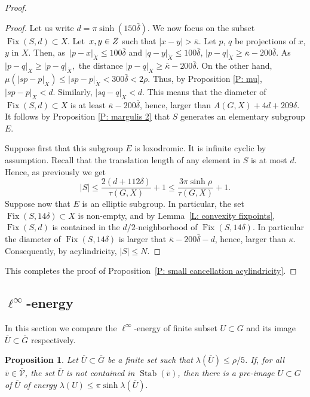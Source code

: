 \documentclass[JEP,XML,SOM,Unicode, NoEqCountersInSection,published]{cedram}
\let\mathcal\mathscr
\theoremstyle{plain}
\newtheorem{prop}[thm]{Proposition}
\theoremstyle{definition}
\newcommand{\cX}{\dot{X}}
\newcommand{\qG}{\overline{G}}
\DeclareMathOperator{\Fix}{Fix}
\newcommand{\q}[1]{\overline{#1}}
\newcommand{\stab}[1]{\operatorname{Stab}(#1)}
\begin{document}
\begin{proof}
\begin{proof}
Let us write $d=\pi \sinh (150\bar \delta)$.
We now focus on the subset $\Fix(S,d) \subset X$.
Let~$x,y \in\nobreak Z$ such that $|x-y|>\q \kappa$.
Let $p$, $q$ be projections of $x$, $y$ in $X$. Then, as~$|p-x|_{\cX}\leqslant 100 \bar \delta$ and $ |q-y|_{\cX} \leqslant 100 \bar \delta$, $|p-q|_{\cX}\geqslant \q \kappa - 200 \bar \delta$. As $|p-q|_X\geqslant |p-q|_{\cX},$
the distance $ |p-q|_X \geqslant\q \kappa - 200 \bar \delta.$
On the other hand, $\mu (|sp-p|_X)\leqslant |sp-p|_{\cX} < 300 \bar \delta <2\rho$. Thus, by Proposition \ref{P: mu}, $ |sp-p|_X< d.$ Similarly, $|sq-q|_X < d$.
This means that the diameter of $\Fix(S,d) \subset X$ is at least $\q\kappa -200 \bar \delta$, hence, larger than $A(G,X) +4d+209\delta$.
It follows by Proposition \ref{P: margulis 2} that $S$ generates an elementary subgroup $E$.

Suppose first that this subgroup $E$ is loxodromic.
It is infinite cyclic by assumption.
Recall that the translation length of any element in $S$ is at most $d$.
Hence, as previously we get
\begin{equation*}
|S|\leqslant \frac {2(d+112\delta)}{\tau(G, X)} +1 \leqslant \frac{3 \pi \sinh\rho}{\tau(G, X)}+1.
\end{equation*}
Suppose now that $E$ is an elliptic subgroup.
In particular, the set $\Fix(S,14\delta) \subset X$ is non-empty, and by Lemma~\ref{L: convexity fixpoints}, $\Fix(S,d)$ is contained in the $d/2$-neighborhood of $\Fix(S, 14\delta)$.
In particular the diameter of $\Fix(S, 14\delta)$ is larger that $\q\kappa -200 \bar\delta-d$, hence, larger than $\kappa$.
Consequently, by acylindricity, $|S| \leq N$.
\end{proof}

This completes the proof of Proposition~\ref{P: small cancellation acylindricity}.
\end{proof}

\subsection{\texorpdfstring{$\ell^{\infty}$-energy}{Energy}}

In this section we compare the $\ell^{\infty}$-energy of finite subset $U\subset G$ and its image $\q U\subset \q G$ respectively.

\begin{prop}\label{P: energy lift}
Let $\q U \subset \qG$ be a finite set such that $\lambda(\q U)\leqslant \rho/5$.
If, for all $\q v\in \q {\mathcal V}$, the set $\q U$ is not contained in $\stab{\q v}$, then there is a pre-image $U\subset G $ of $\q U$ of energy
$\lambda(U) \leqslant \pi \sinh \lambda(\q U).$
\end{prop}
\end{document}
